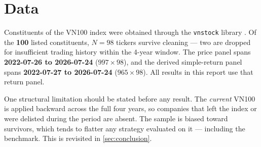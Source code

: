 \section{Data}\label{sec:data}

Constituents of the VN100 index were obtained through the \texttt{vnstock} library
\citep{vnstock}. Of the \textbf{100} listed constituents, $N = 98$ tickers survive cleaning ---
two are dropped for insufficient trading history within the 4-year window. The price panel
spans \textbf{2022-07-26 to 2026-07-24} ($997 \times 98$), and the derived simple-return panel
spans \textbf{2022-07-27 to 2026-07-24} ($965 \times 98$). All results in this report use that
return panel.

One structural limitation should be stated before any result. The \emph{current} VN100
is applied backward across the full four years, so companies that left the index or
were delisted during the period are absent. The sample is biased toward survivors, which tends
to flatter any strategy evaluated on it --- including the benchmark. This is revisited in
\cref{sec:conclusion}.
